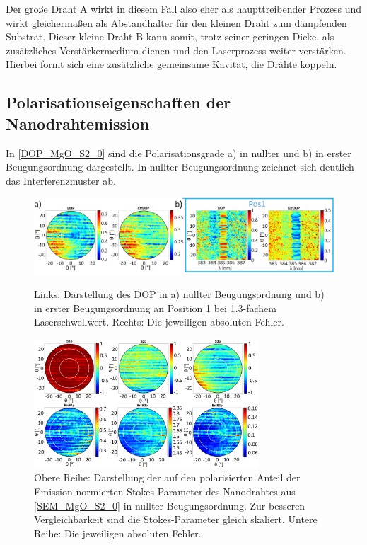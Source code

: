 Der große Draht A wirkt in diesem Fall also eher als haupttreibender Prozess und wirkt gleichermaßen als Abstandhalter für den kleinen Draht zum dämpfenden Substrat. Dieser kleine Draht B kann somit, trotz seiner geringen Dicke, als zusätzliches Verstärkermedium dienen und den Laserprozess weiter verstärken. Hierbei formt sich eine zusätzliche gemeinsame Kavität, die Drähte koppeln.
\subsection{Polarisationseigenschaften der Nanodrahtemission}
In \autoref{DOP_MgO_S2_0} sind die Polarisationsgrade a) in nullter und b) in erster Beugungsordnung dargestellt. In nullter Beugungsordnung zeichnet sich deutlich das Interferenzmuster ab.\begin{figure}[b]
\centering
\includegraphics[width=1\textwidth]{Bilder/MgO/DOP_MgO_S2_0}
\caption{Links: Darstellung des DOP in a) nullter Beugungsordnung und b) in erster Beugungsordnung an Position 1 bei 1.3-fachem Laserschwellwert. Rechts: Die jeweiligen absoluten Fehler.}
\label{DOP_MgO_S2_0}
\includegraphics[width=0.75\textwidth]{Bilder/MgO/StokesP_S2_MgO_0}
\caption{Obere Reihe: Darstellung der auf den polarisierten Anteil der Emission normierten Stokes-Parameter des Nanodrahtes aus \autoref{SEM_MgO_S2_0} in nullter Beugungsordnung. Zur besseren Vergleichbarkeit sind die Stokes-Parameter gleich skaliert. Untere Reihe: Die jeweiligen absoluten Fehler.}
\label{StokesP_S2_MgO_0}

\end{figure}
